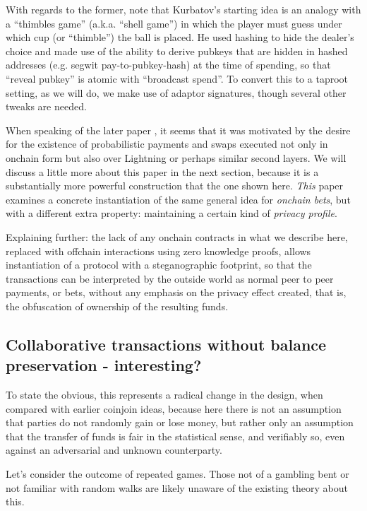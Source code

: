 \documentclass[11pt]{article}
\begin{document}
With regards to the former, note that Kurbatov's starting idea is an analogy with a ``thimbles game'' (a.k.a. ``shell game'') in which the player must guess under which cup (or ``thimble'') the ball is placed. He used hashing to hide the dealer's choice and made use of the ability to derive pubkeys that are hidden in hashed addresses (e.g. segwit pay-to-pubkey-hash) at the time of spending, so that ``reveal pubkey'' is atomic with ``broadcast spend''. To convert this to a taproot setting, as we will do, we make use of adaptor signatures, though several other tweaks are needed.

When speaking of the later paper \cite{gerhardt2026}, it seems that it was motivated by the desire for the existence of probabilistic payments and swaps executed not only in onchain form but also over Lightning or perhaps similar second layers. We will discuss a little more about this paper in the next section, because it is a substantially more powerful construction that the one shown here. \emph{This} paper examines a concrete instantiation of the same general idea for \emph{onchain bets}, but with a different extra property: maintaining a certain kind of \emph{privacy profile}.

Explaining further: the lack of any onchain contracts in what we describe here, replaced with offchain interactions using zero knowledge proofs, allows instantiation of a protocol with a steganographic footprint, so that the transactions can be interpreted by the outside world as normal peer to peer payments, or bets, without any emphasis on the privacy effect created, that is, the obfuscation of ownership of the resulting funds.

\subsection{Collaborative transactions without balance preservation - interesting?}

To state the obvious, this represents a radical change in the design, when compared with earlier coinjoin ideas, because here there is not an assumption that parties do not randomly gain or lose money, but rather only an assumption that the transfer of funds is fair in the statistical sense, and verifiably so, even against an adversarial and unknown counterparty.

Let's consider the outcome of repeated games. Those not of a gambling bent or not familiar with random walks are likely unaware of the existing theory about this.
\end{document}
